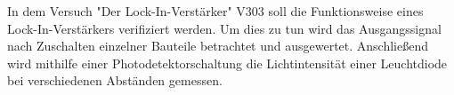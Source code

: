 In dem Versuch "Der Lock-In-Verstärker" V303 soll die Funktionsweise eines Lock-In-Verstärkers verifiziert werden.
Um dies zu tun wird das Ausgangssignal nach Zuschalten
einzelner Bauteile betrachtet und ausgewertet. Anschließend wird
mithilfe einer Photodetektorschaltung die Lichtintensität einer Leuchtdiode bei verschiedenen Abständen gemessen.
